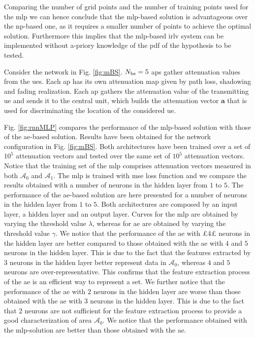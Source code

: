 \documentclass[draftcls,onecolumn,12pt]{IEEEtran}
\begin{document}
Comparing the number of grid points and the number of training points used for the \ac{mlp} we can hence conclude that the \ac{mlp}-based solution is advantageous over the \ac{np}-based one, as it requires a smaller number of points to achieve the optimal solution. Furthermore this implies that the \ac{mlp}-based \ac{irlv} system can be implemented without a-priory knowledge of the \ac{pdf} of the hypothesis to be tested.

Consider the network in Fig. \ref{fig:mBS}. $N_{\rm bs}=5$ \acp{ap} gather attenuation values from the \acp{ue}. Each \ac{ap} has its own attenuation map given by path loss, shadowing and fading realization. Each \ac{ap} gathers the attenuation value of the transmitting \ac{ue} and sends it to the central unit, which builds the attenuation vector $\bm{a}$ that is used for discriminating the location of the considered \ac{ue}.

Fig. \ref{fig:rnnMLP} compares the performance of the \ac{mlp}-based solution with those of the \ac{ae}-based solution. Results have been obtained for the network configuration in Fig. \ref{fig:mBS}. Both architectures have been trained over a set of $10^5$ attenuation vectors and tested over the same set of $10^5$ attenuation vectors. Notice that the training set of the \ac{mlp} comprises attenuation vectors measured in both $\mathcal{A}_0$ and $\mathcal{A}_1$. The \ac{mlp} is trained with \ac{mse} loss function and we compare the results obtained with a number of neurons in the hidden layer from $1$ to $5$. The performance of the \ac{ae}-based solution are here presented for a number of neurons in the hidden layer from $1$ to $5$. Both architectures are composed by an input layer, a hidden layer and an output layer. Curves for the \ac{mlp} are obtained by varying the threshold value $\lambda$, whereas for \ac{ae} are obtained by varying the threshold value $\gamma$. We notice that the performance of the \ac{ae} with £4£ neurons in the hidden layer are better compared to those obtained with the \ac{ae} with $4$ and $5$ neurons in the hidden layer. This is due to the fact that the features extracted by $3$ neurons in the hidden layer better represent data in $\mathcal{A}_0$, whereas $4$ and $5$ neurons are over-representative. This confirms that the feature extraction process of the \ac{ae} is an efficient way to represent a set. We further notice that the performance of the \ac{ae} with $2$ neurons in the hidden layer are worse than those obtained with the \ac{ae} with $3$ neurons in the hidden layer. This is due to the fact that $2$ neurons are not sufficient for the feature extraction process to provide a good characterization of area $\mathcal{A}_0$. We notice that the performance obtained with the \ac{mlp}-solution are better than those obtained with the \ac{ae}. 
\end{document}
